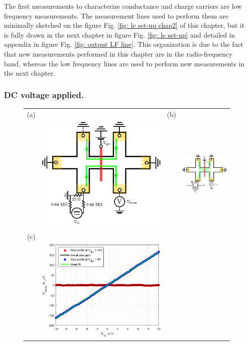 The first measurements to characterize conductance and charge carriers are low frequency measurements.
The measurement lines used to perform them are minimally sketched on the figure Fig. \ref{fig: le set-up chap2} of this chapter, but it is fully drawn in the next chapter in figure Fig. \ref{fig: le set-up} and detailed in appendix in figure Fig. \ref{fig: output LF line}.
This organization is due to the fact that new measurements performed in this chapter are in the radio-frequency band, whereas the low frequency lines are used to perform new measurements in the next chapter.

\subsubsection*{DC voltage applied.}

\begin{figure}[hptb]
	\begin{center}
		\begin{tabular}{c c c c}
			(a) & & (b) & \\
			& \includegraphics[width = 6.5 cm]{./chap2/Hall_bar_split_gate_open} &
			& \includegraphics[width = 6.5 cm]{./chap2/Hall_bar_split_gate_close} \\
			(c) & & & \\
			& \includegraphics[width = 6.5 cm]{./chap2/DC_line_gain} &
			& 
			

\end{tabular}
\end{center}
\end{figure}
